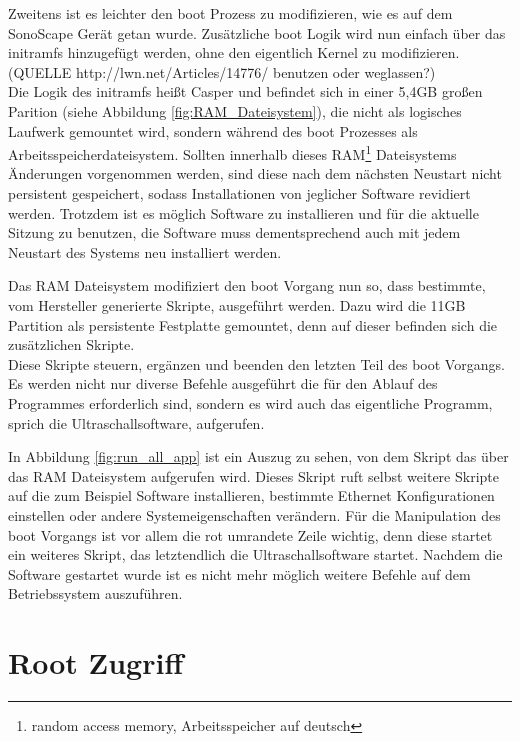 Zweitens ist es leichter den boot Prozess zu modifizieren, wie es auf dem SonoScape Gerät getan wurde. Zusätzliche boot Logik wird nun einfach über das initramfs hinzugefügt werden, ohne den eigentlich Kernel zu modifizieren. (QUELLE http://lwn.net/Articles/14776/ benutzen oder weglassen?)\\
Die Logik des initramfs heißt Casper und befindet sich in einer 5,4GB großen Parition (siehe Abbildung \ref{fig:RAM_Dateisystem}), die nicht als logisches Laufwerk gemountet wird, sondern während des boot Prozesses als Arbeitsspeicherdateisystem. Sollten innerhalb dieses RAM\footnote{random access memory, Arbeitsspeicher auf deutsch} Dateisystems Änderungen vorgenommen werden, sind diese nach dem nächsten Neustart nicht persistent gespeichert, sodass Installationen von jeglicher Software revidiert werden. Trotzdem ist es möglich Software zu installieren und für die aktuelle Sitzung zu benutzen, die Software muss dementsprechend auch mit jedem Neustart des Systems neu installiert werden.

Das RAM Dateisystem modifiziert den boot Vorgang nun so, dass bestimmte, vom Hersteller generierte  Skripte, ausgeführt werden. Dazu wird die 11GB Partition als persistente Festplatte gemountet, denn auf dieser befinden sich die zusätzlichen Skripte.\\
Diese Skripte steuern, ergänzen und beenden den letzten Teil des boot Vorgangs. Es werden nicht nur diverse Befehle ausgeführt die für den Ablauf des Programmes erforderlich sind, sondern es wird auch das eigentliche Programm, sprich die Ultraschallsoftware, aufgerufen.

In Abbildung \ref{fig:run_all_app} ist ein Auszug zu sehen, von dem Skript das über das RAM Dateisystem aufgerufen wird. Dieses Skript ruft selbst weitere Skripte auf die zum Beispiel Software installieren, bestimmte Ethernet Konfigurationen einstellen oder andere Systemeigenschaften verändern. Für die Manipulation des boot Vorgangs ist vor allem die rot umrandete Zeile wichtig, denn diese startet ein weiteres Skript, das letztendlich die Ultraschallsoftware startet. Nachdem die Software gestartet wurde ist es nicht mehr möglich weitere Befehle auf dem Betriebssystem auszuführen.\\

\section{Root Zugriff}

